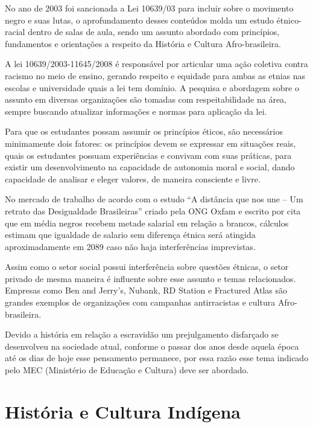 \documentclass[12pt,oneside,a4paper,chapter=TITLE,section=TITLE,sumario
=tradicional]{abntex2}
\begin{document}
No ano de 2003 foi sancionada a Lei 10639/03 \cite{lei-10639} para incluir sobre o movimento negro e suas lutas, o aprofundamento desses conteúdos molda um estudo étnico-racial dentro de salas de aula, sendo um assunto abordado com princípios, fundamentos e orientações a respeito da História e Cultura Afro-brasileira.

A lei 10639/2003-11645/2008 \cite{lei-10639} é responsável por articular uma ação coletiva contra racismo no meio de ensino, gerando respeito e equidade para ambas as etnias nas escolas e universidade quais a lei tem domínio. A pesquisa e abordagem sobre o assunto em diversas organizações são tomadas com respeitabilidade na área, sempre buscando atualizar informações e normas para aplicação da lei.

Para que os estudantes possam assumir os princípios éticos, são necessários minimamente dois fatores: os princípios devem se expressar em situações reais, quais os estudantes possuam experiências e convivam com suas práticas, para existir um desenvolvimento na capacidade de autonomia moral e social, dando capacidade de analisar e eleger valores, de maneira consciente e livre.

No mercado de trabalho de acordo com o estudo “A distância que nos une – Um retrato das Desigualdade Brasileiras” criado pela ONG Oxfam e escrito por  cita que em média negros recebem metade salarial em relação a brancos, cálculos estimam que igualdade de salario sem diferença étnica será atingida aproximadamente em 2089 caso não haja interferências imprevistas.

Assim como o setor social possui interferência sobre questões étnicas, o setor privado de mesma maneira é influente sobre esse assunto e temas relacionados. Empresas como Ben and Jerry’s, Nubank, RD Station e Fractured Atlas são grandes exemplos de organizações com campanhas antirracistas e cultura Afro-brasileira.

Devido a história em relação a escravidão um prejulgamento disfarçado se desenvolveu na sociedade atual, conforme o passar dos anos desde aquela época até os dias de hoje esse pensamento permanece, por essa razão esse tema indicado pelo MEC (Ministério de Educação e Cultura) deve ser abordado. 
\chapter{História e Cultura Indígena}
\label{cap:historia-e-cultura-indigena}
\end{document}
